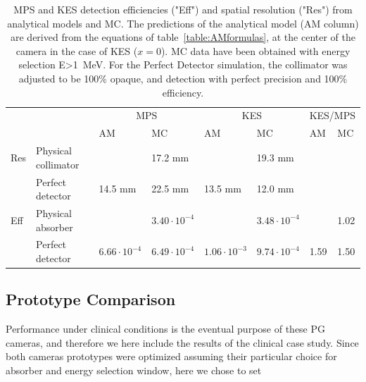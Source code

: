 \documentclass[a4paper,english]{article}
\begin{document}
\begin{table}[h]
\centering
\begin{tabular}{llllllll}
	\midrule
	\multicolumn{2}{c}{}	& \multicolumn{2}{c}{MPS}												& \multicolumn{2}{c}{KES}										& \multicolumn{2}{c}{KES/MPS}\\
	\cline{3-8}
	\multicolumn{2}{c}{}& AM 											& MC 									& AM 										& MC								& AM 										& MC\\
	\midrule
	Res	& Physical collimator		& 												& 17.2 mm 	 					&  								& 19.3 mm						&&\\
			& Perfect detector	& 14.5 mm								& 22.5 mm 	 					& 13.5 mm								& 12.0 mm						&&\\
	Eff & Physical absorber		&  	& $3.40\cdot10^{-4}$	&	 & $3.48\cdot10^{-4}$& 	& 1.02	\\
	    & Perfect detector	&  $6.66 \cdot 10^{-4}$  	& $6.49\cdot10^{-4}$	&	$1.06 \cdot 10^{-3}$   & $9.74\cdot10^{-4}$& 1.59	& 1.50	\\
 	\midrule
\end{tabular}
\caption{MPS and KES detection efficiencies ("Eff") and spatial resolution ("Res") from analytical models and MC. The predictions of the analytical model (AM column) are derived from the equations of table~\ref{table:AMformulas}, at the center of the camera in the case of KES ($x=0$). MC data have been obtained with energy selection E>1~MeV. For the Perfect Detector simulation, the collimator was adjusted to be 100\% opaque, and detection with perfect precision and 100\% efficiency.}
\label{tab:AMV}
\end{table}



\subsection{Prototype Comparison}

Performance under clinical conditions is the eventual purpose of these PG cameras, and therefore we here include the results of the clinical case study. Since both cameras prototypes were optimized assuming their particular choice for absorber and energy selection window, here we chose to set 
\end{document}

